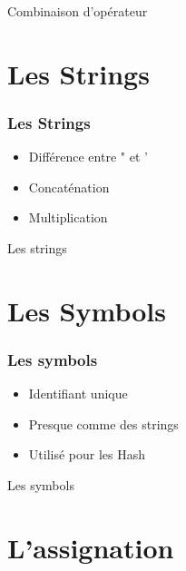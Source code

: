 \documentclass{beamer}
\begin{document}
\begin{frame}
  \begin{beamerboxesrounded}{Combinaison d'op\'erateur}
    
  \end{beamerboxesrounded}
\end{frame}

\section{Les Strings}

\begin{frame}
  \frametitle{Les Strings}
  \begin{itemize}
    \item Diff\'erence entre " et '
    \item Concat\'enation
    \item Multiplication
  \end{itemize}
\end{frame}

\begin{frame}
  \begin{beamerboxesrounded}{Les strings}
    
  \end{beamerboxesrounded}
\end{frame}

\section{Les Symbols}

\begin{frame}
  \frametitle{Les symbols}
  \begin{itemize}
    \item Identifiant unique
    \item Presque comme des strings
    \item Utilis\'e  pour les Hash
  \end{itemize}
\end{frame}

\begin{frame}
  \begin{beamerboxesrounded}{Les symbols}
    
  \end{beamerboxesrounded}
\end{frame}


\section{L'assignation}
\end{document}
